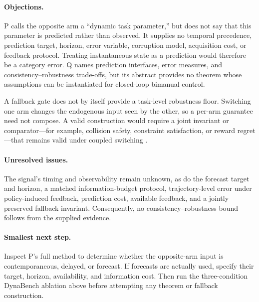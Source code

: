 \documentclass{article}
\begin{document}
\paragraph{Objections.}
P calls the opposite arm a ``dynamic task parameter,'' but does not say that this parameter is predicted rather than observed. It supplies no temporal precedence, prediction target, horizon, error variable, corruption model, acquisition cost, or feedback protocol. Treating instantaneous state as a prediction would therefore be a category error. Q names prediction interfaces, error measures, and consistency--robustness trade-offs, but its abstract provides no theorem whose assumptions can be instantiated for closed-loop bimanual control.

A fallback gate does not by itself provide a task-level robustness floor. Switching one arm changes the endogenous input seen by the other, so a per-arm guarantee need not compose. A valid construction would require a joint invariant or comparator---for example, collision safety, constraint satisfaction, or reward regret---that remains valid under coupled switching .

\paragraph{Unresolved issues.}
The signal's timing and observability remain unknown, as do the forecast target and horizon, a matched information-budget protocol, trajectory-level error under policy-induced feedback, prediction cost, available feedback, and a jointly preserved fallback invariant. Consequently, no consistency--robustness bound follows from the supplied evidence.

\paragraph{Smallest next step.}
Inspect P's full method to determine whether the opposite-arm input is contemporaneous, delayed, or forecast. If forecasts are actually used, specify their target, horizon, availability, and information cost. Then run the three-condition DynaBench ablation above before attempting any theorem or fallback construction.
\end{document}
